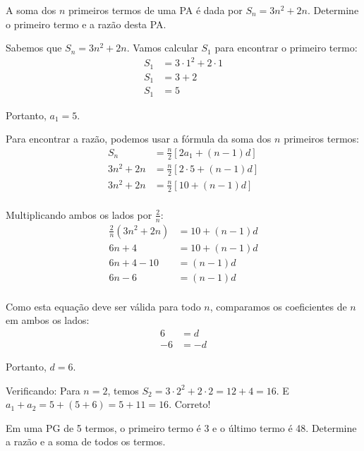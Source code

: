 \documentclass[12pt,a4paper]{article}
\begin{document}
\begin{tcolorbox}[colback=blue!5!white,colframe=blue!75!black,title=Exercício Adicional 3]
A soma dos $n$ primeiros termos de uma PA é dada por $S_n = 3n^2 + 2n$. Determine o primeiro termo e a razão desta PA.
\end{tcolorbox}

\begin{tcolorbox}[colback=green!5!white,colframe=green!75!black,title=Resolução]
Sabemos que $S_n = 3n^2 + 2n$. Vamos calcular $S_1$ para encontrar o primeiro termo:
\begin{align}
S_1 &= 3 \cdot 1^2 + 2 \cdot 1\\
S_1 &= 3 + 2\\
S_1 &= 5
\end{align}

Portanto, $a_1 = 5$.

Para encontrar a razão, podemos usar a fórmula da soma dos $n$ primeiros termos:
\begin{align}
S_n &= \frac{n}{2}[2a_1 + (n-1)d]\\
3n^2 + 2n &= \frac{n}{2}[2 \cdot 5 + (n-1)d]\\
3n^2 + 2n &= \frac{n}{2}[10 + (n-1)d]\\
\end{align}

Multiplicando ambos os lados por $\frac{2}{n}$:
\begin{align}
\frac{2}{n}(3n^2 + 2n) &= 10 + (n-1)d\\
6n + 4 &= 10 + (n-1)d\\
6n + 4 - 10 &= (n-1)d\\
6n - 6 &= (n-1)d\\
\end{align}

Como esta equação deve ser válida para todo $n$, comparamos os coeficientes de $n$ em ambos os lados:
\begin{align}
6 &= d\\
-6 &= -d
\end{align}

Portanto, $d = 6$.

Verificando: Para $n = 2$, temos $S_2 = 3 \cdot 2^2 + 2 \cdot 2 = 12 + 4 = 16$. 
E $a_1 + a_2 = 5 + (5 + 6) = 5 + 11 = 16$. Correto!
\end{tcolorbox}

\begin{tcolorbox}[colback=blue!5!white,colframe=blue!75!black,title=Exercício Adicional 4]
Em uma PG de 5 termos, o primeiro termo é 3 e o último termo é 48. Determine a razão e a soma de todos os termos.
\end{tcolorbox}
\end{document}
